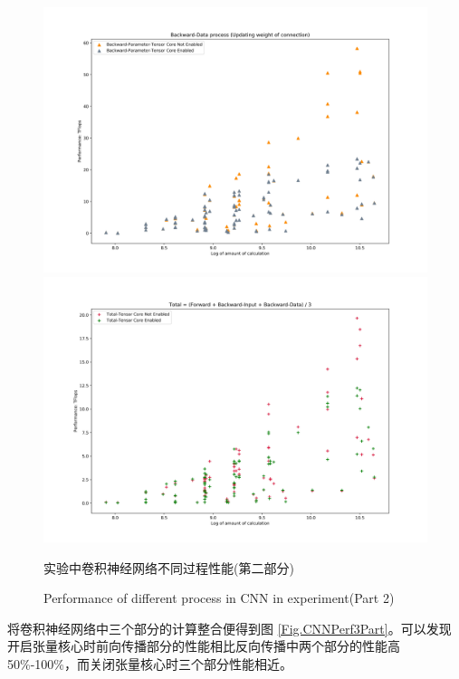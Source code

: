 \begin{figure}
	\centering
	\includegraphics[width=15cm]{figures/CNN-HALF-BWD-DATA.jpg}\\
	\includegraphics[width=15cm]{figures/CNN-HALF-TOTAL.jpg}
	\renewcommand{\thefigure}{\arabic{section}-\arabic{figure} }
	\renewcommand{\figurename}{图}
	\caption{实验中卷积神经网络不同过程性能(第二部分)}
	\addtocounter{figure}{-1}
	\renewcommand{\thefigure}{\arabic{section}-\arabic{figure} }
	\renewcommand{\figurename}{Figure}
	\caption{Performance of different process in CNN in experiment(Part 2)}
	\label{Fig.CNNPerf-2}
\end{figure}
\par 将卷积神经网络中三个部分的计算整合便得到图 \ref{Fig.CNNPerf3Part}。可以发现开启张量核心时前向传播部分的性能相比反向传播中两个部分的性能高50\%-100\%，而关闭张量核心时三个部分性能相近。
